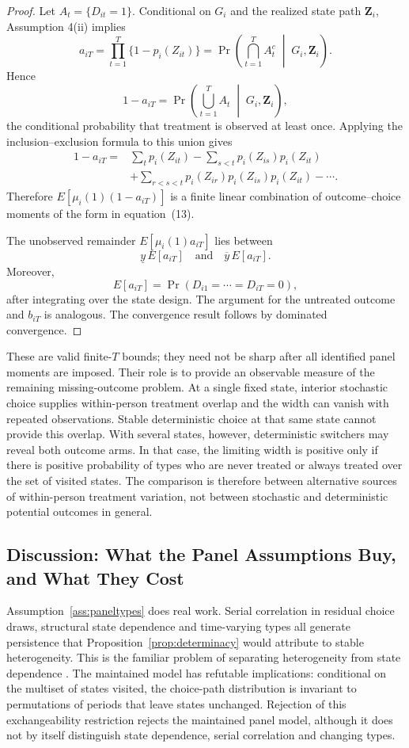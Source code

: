 \documentclass[11pt]{article}
\newcommand{\1}{\mathbf{1}}
\begin{document}
\begin{proof}
Let \(A_t=\{D_{it}=1\}\). Conditional on \(G_i\) and the realized state path
\(\mathbf Z_i\), Assumption 4(ii) implies
\[
a_{iT}
=
\prod_{t=1}^T \{1-p_i(Z_{it})\}
=
\Pr\left(
\bigcap_{t=1}^T A_t^c
\;\middle|\;
G_i,\mathbf Z_i
\right).
\]
Hence
\[
1-a_{iT}
=
\Pr\left(
\bigcup_{t=1}^T A_t
\;\middle|\;
G_i,\mathbf Z_i
\right),
\]
the conditional probability that treatment is observed at least once.
Applying the inclusion--exclusion formula to this union gives
\[
\begin{aligned}
1-a_{iT}
={}&
\sum_t p_i(Z_{it})
-\sum_{s<t} p_i(Z_{is})p_i(Z_{it}) \\
&+\sum_{r<s<t}
p_i(Z_{ir})p_i(Z_{is})p_i(Z_{it})
-\cdots .
\end{aligned}
\]
Therefore \(E[\mu_i(1)(1-a_{iT})]\) is a finite linear combination of
outcome--choice moments of the form in equation~(13).

The unobserved remainder \(E[\mu_i(1)a_{iT}]\) lies between
\[
\underline y\,E[a_{iT}]
\quad\text{and}\quad
\overline y\,E[a_{iT}].
\]
Moreover,
\[
E[a_{iT}]
=
\Pr(D_{i1}=\cdots=D_{iT}=0),
\]
after integrating over the state design. The argument for the untreated
outcome and \(b_{iT}\) is analogous. The convergence result follows by
dominated convergence.
\end{proof}

These are valid finite-$T$ bounds; they need not be sharp after all identified
panel moments are imposed. Their role is to provide an observable measure of
the remaining missing-outcome problem. At a single fixed state, interior
stochastic choice supplies within-person treatment overlap and the width can
vanish with repeated observations. Stable deterministic choice at that same
state cannot provide this overlap. With several states, however, deterministic
switchers may reveal both outcome arms. In that case, the limiting width is
positive only if there is positive probability of types who are never treated
or always treated over the set of visited states. The comparison is therefore
between alternative sources of within-person treatment variation, not between
stochastic and deterministic potential outcomes in general.

\subsection{Discussion: What the Panel Assumptions Buy, and What They Cost}
\label{subsec:panel-discussion}

Assumption~\ref{ass:paneltypes} does real work. Serial correlation in residual choice draws, structural state dependence and time-varying types all generate persistence that Proposition~\ref{prop:determinacy} would attribute to stable heterogeneity. This is the familiar problem of separating heterogeneity from state dependence \citep{heckman1981,chamberlain1984,chamberlain1985}. The maintained model has refutable implications: conditional on the multiset of states visited, the choice-path distribution is invariant to permutations of periods that leave states unchanged. Rejection of this exchangeability restriction rejects the maintained panel model, although it does not by itself distinguish state dependence, serial correlation and changing types.
\end{document}
